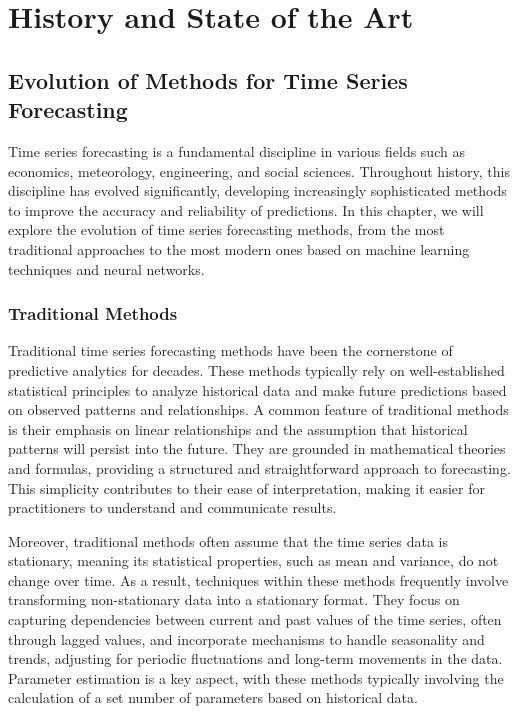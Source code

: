 \chapter{History and State of the Art}
\pagestyle{esitscCD}

\section{Evolution of Methods for Time Series Forecasting}

Time series forecasting is a fundamental discipline in various fields such as economics, meteorology, engineering, and social sciences. Throughout history, this discipline has evolved significantly, developing increasingly sophisticated methods to improve the accuracy and reliability of predictions. In this chapter, we will explore the evolution of time series forecasting methods, from the most traditional approaches to the most modern ones based on machine learning techniques and neural networks.


\subsection{Traditional Methods}

Traditional time series forecasting methods have been the cornerstone of predictive analytics for decades. These methods typically rely on well-established statistical principles to analyze historical data and make future predictions based on observed patterns and relationships. A common feature of traditional methods is their emphasis on linear relationships and the assumption that historical patterns will persist into the future. They are grounded in mathematical theories and formulas, providing a structured and straightforward approach to forecasting. This simplicity contributes to their ease of interpretation, making it easier for practitioners to understand and communicate results.

Moreover, traditional methods often assume that the time series data is stationary, meaning its statistical properties, such as mean and variance, do not change over time. As a result, techniques within these methods frequently involve transforming non-stationary data into a stationary format. They focus on capturing dependencies between current and past values of the time series, often through lagged values, and incorporate mechanisms to handle seasonality and trends, adjusting for periodic fluctuations and long-term movements in the data. Parameter estimation is a key aspect, with these methods typically involving the calculation of a set number of parameters based on historical data.
\vspace{10pt}


